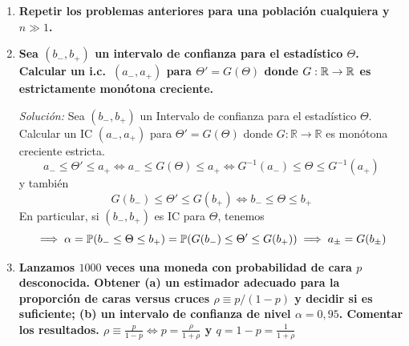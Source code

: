 \begin{enumerate}
  Es decir
  \[
    \alpha = \Prob\!\left(c_- \leq 3.16\,\frac{\overline{X}_n - \mu}{S_n} \leq c_+\right) = \Prob(\mu - 0.705 S_n \leq \overline{X}_n \leq \mu + 0.705 S_n)
  \]
  que no permite construir el intervalo de confianza para la media muestral $\overline{X}_n$.
  Sin embargo, también es
  \[
    \alpha = \Prob(\overline{X}_n - 0.705 S_n \leq \mu \leq \overline{X}_n + 0.705 S_n)
  \]
  y dada la muestra tendríamos el IC para el parámetro $\mu$:
  \[
    \alpha = \Prob(\overline{x}_n - 0.705 s_n \leq \mu \leq \overline{x}_n + 0.705 s_n) \iff I_\mu = (\overline{x}_n - 0.705 s_n, \overline{x}_n + 0.705 s_n)
  \]
  \item \textbf{Repetir los problemas anteriores para una población cualquiera y $n \gg 1$.}

  \item \textbf{Sea $(b_-, b_+)$ un intervalo de confianza para el estadístico $\Theta$. Calcular un i.c.\ $(a_-, a_+)$ para $\Theta' = G(\Theta)$ donde $G : \mathbb{R} \to \mathbb{R}$ es estrictamente monótona creciente.}

  \smallskip
  \noindent\emph{Solución:} Sea $(b_-, b_+)$ un Intervalo de confianza para el estadístico $\Theta$. Calcular un IC $(a_-, a_+)$ para $\Theta' = G(\Theta)$ donde $G : \mathbb{R} \to \mathbb{R}$ es monótona creciente estricta.
  \[
    a_- \leq \Theta' \leq a_+ \iff a_- \leq G(\Theta) \leq a_+ \iff G^{-1}(a_-) \leq \Theta \leq G^{-1}(a_+)
  \]
  y también
  \[
    G(b_-) \leq \Theta' \leq G(b_+) \iff b_- \leq \Theta \leq b_+
  \]
  En particular, si $(b_-, b_+)$ es IC para $\Theta$, tenemos
  \[
    \implies \alpha = \mathbb{P}(b_- \leq \Theta \leq b_+) = \mathbb{P}(G(b_-) \leq \Theta' \leq G(b_+)) \implies a_\pm = G(b_\pm)
  \]

  \item \textbf{Lanzamos $1000$ veces una moneda con probabilidad de cara $p$ desconocida. Obtener (a) un estimador adecuado para la proporción de caras versus cruces $\rho \equiv p/(1-p)$ y decidir si es suficiente; (b) un intervalo de confianza de nivel $\alpha = 0{,}95$. Comentar los resultados. $\rho \equiv \frac{p}{1-p} \iff p = \frac{\rho}{1+\rho}$ y $q = 1 - p = \frac{1}{1+\rho}$}


\end{enumerate}
